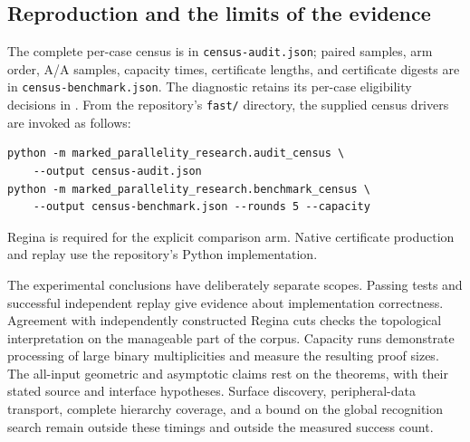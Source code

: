 \subsection{Reproduction and the limits of the evidence}
\label{main:exp-reproduction}

The complete per-case census is in \texttt{census-audit.json}; paired samples,
arm order, A/A samples, capacity times, certificate lengths, and certificate
digests are in \texttt{census-benchmark.json}.  The diagnostic retains its
per-case eligibility decisions in
.  From the repository's
\texttt{fast/} directory, the supplied census drivers are invoked as follows:
\begin{lstlisting}
python -m marked_parallelity_research.audit_census \
    --output census-audit.json
python -m marked_parallelity_research.benchmark_census \
    --output census-benchmark.json --rounds 5 --capacity
\end{lstlisting}
Regina is required for the explicit comparison arm.  Native certificate
production and replay use the repository's Python implementation.

The experimental conclusions have deliberately separate scopes.  Passing
tests and successful independent replay give evidence about implementation
correctness.  Agreement with independently constructed Regina cuts checks
the topological interpretation on the manageable part of the corpus.
Capacity runs demonstrate processing of large binary multiplicities and
measure the resulting proof sizes.  The all-input geometric and asymptotic
claims rest on the theorems, with their stated source and interface
hypotheses.  Surface discovery, peripheral-data transport, complete hierarchy
coverage, and a bound on the global recognition search remain outside these
timings and outside the measured success count.
